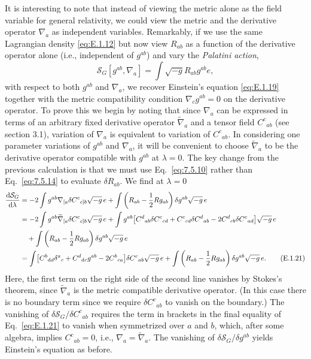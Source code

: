 It is interesting to note that instead of viewing the metric alone as the field variable
for general relativity, we could view the metric and the derivative operator
\(\nabla_a\) as independent variables. Remarkably, if we use the same Lagrangian
density \eqref{eq:E.1.12} but now view \(R_{ab}\) as a function of the derivative
operator alone (i.e., independent of \(g^{ab}\)) and vary the \emph{Palatini action},
\begin{equation}
  \mathcal S_G[g^{ab},\nabla_a]
    =\int\sqrt{-g}R_{ab}g^{ab}e,
  \tag{E.1.20}\label{eq:E.1.20}
\end{equation}
with respect to both \(g^{ab}\) and \(\nabla_a\), we recover Einstein's equation
\eqref{eq:E.1.19} together with the metric compatibility condition
\(\nabla_cg^{ab}=0\) on the derivative operator. To prove this we begin by noting
that since \(\nabla_a\) can be expressed in terms of an arbitrary fixed derivative
operator \(\widetilde\nabla_a\) and a tensor field \(C^c{}_{ab}\) (see section 3.1),
variation of \(\nabla_a\) is equivalent to variation of \(C^c{}_{ab}\). In considering
one parameter variations of \(g^{ab}\) and \(\nabla_a\), it will be convenient to
choose \(\widetilde\nabla_a\) to be the derivative operator compatible with
\(g^{ab}\) at \(\lambda=0\). The key change from the previous calculation is that
we must use Eq.~\eqref{eq:7.5.10} rather than Eq.~\eqref{eq:7.5.14} to evaluate
\(\delta R_{ab}\). We find at \(\lambda=0\)
\begin{align}
  \frac{\mathop{}\!\mathrm{d}\mathcal S_G}{\mathop{}\!\mathrm{d}\lambda}
    &=-2\int g^{ab}\nabla_{[a}\delta C^c{}_{c]b}\sqrt{-g}\,e
      +\int\left(R_{ab}-\frac{1}{2}Rg_{ab}\right)
        \delta g^{ab}\sqrt{-g}\,e\notag\\
    &=-2\int g^{ab}\widetilde\nabla_{[a}\delta C^c{}_{c]b}\sqrt{-g}\,e
      +\int g^{ab}\bigl[
        C^d{}_{ab}\delta C^c{}_{cd}
        +C^c{}_{cd}\delta C^d{}_{ab}
        -2C^d{}_{cb}\delta C^c{}_{ad}\bigr]\sqrt{-g}\,e\notag\\
    &\quad+\int\left(R_{ab}-\frac{1}{2}Rg_{ab}\right)
        \delta g^{ab}\sqrt{-g}\,e\notag\\
    &=\int\bigl[
        C^b{}_{\mathop{}\!\mathrm{d} d}\delta^a{}_c
        +C^d{}_{\mathop{}\!\mathrm{d} c}g^{ab}
        -2C^b{}_{ca}\bigr]\delta C^c{}_{ab}\sqrt{-g}\,e
      +\int\left(R_{ab}-\frac{1}{2}Rg_{ab}\right)
        \delta g^{ab}\sqrt{-g}\,e .
  \tag{E.1.21}\label{eq:E.1.21}
\end{align}
Here, the first term on the right side of the second line vanishes by Stokes's
theorem, since \(\widetilde\nabla_a\) is the metric compatible derivative operator.
(In this case there is no boundary term since we require \(\delta C^c{}_{ab}\) to
vanish on the boundary.) The vanishing of
\(\delta\mathcal S_G/\delta C^c{}_{ab}\) requires the term in brackets in the final
equality of Eq.~\eqref{eq:E.1.21} to vanish when symmetrized over \(a\) and \(b\),
which, after some algebra, implies \(C^c{}_{ab}=0\), i.e.,
\(\nabla_a=\widetilde\nabla_a\). The vanishing of
\(\delta\mathcal S_G/\delta g^{ab}\) yields Einstein's equation as before.

